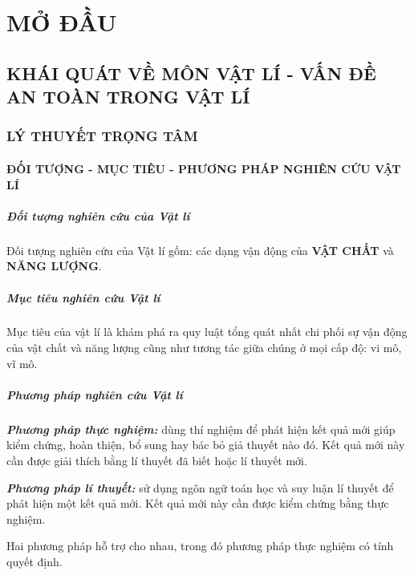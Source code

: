 \chapter{MỞ ĐẦU}
\section{KHÁI QUÁT VỀ MÔN VẬT LÍ - VẤN ĐỀ AN TOÀN TRONG VẬT LÍ}
\subsection{LÝ THUYẾT TRỌNG TÂM}
\begin{tomtat}
	\subsubsection{ĐỐI TƯỢNG - MỤC TIÊU - PHƯƠNG PHÁP NGHIÊN CỨU VẬT LÍ}
	\paragraph{Đối tượng nghiên cứu của Vật lí}
	Đối tượng nghiên cứu của Vật lí gồm: các dạng vận động của \textbf{VẬT CHẤT} và \textbf{NĂNG LƯỢNG}.
	\paragraph{Mục tiêu nghiên cứu Vật lí}
	Mục tiêu của vật lí là khám phá ra quy luật tổng quát nhất chi phối sự vận động của vật chất và năng lượng cũng như tương tác giữa chúng ở mọi cấp độ: vi mô, vĩ mô.
	\paragraph{Phương pháp nghiên cứu Vật lí}
	\begin{dn}
		\textbf{\textit{Phương pháp thực nghiệm:}} dùng thí nghiệm để phát hiện kết quả mới giúp kiểm chứng, hoàn thiện, bổ sung hay bác bỏ giả thuyết nào đó. Kết quả mới này cần được giải thích bằng lí thuyết đã biết hoặc lí thuyết mới.
	\end{dn}
	\begin{dn}
		\textbf{\textit{Phương pháp lí thuyết:}} sử dụng ngôn ngữ toán học và suy luận lí thuyết để phát hiện một kết quả mới. Kết quả mới này cần được kiểm chứng bằng thực nghiệm.
	\end{dn}
	\begin{note}
		Hai phương pháp hỗ trợ cho nhau, trong đó phương pháp thực nghiệm có tính quyết định.
	\end{note}

\end{tomtat}
